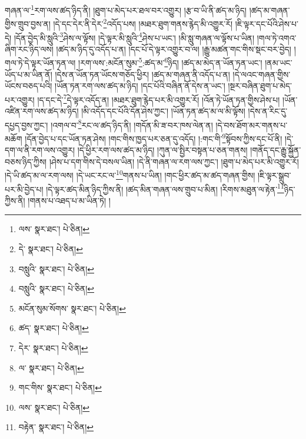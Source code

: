 གཞན་ལ་\footnote{ལས་  སྣར་ཐང་།  པེ་ཅིན། }རག་ལས་ཚད་ཉིད་ནི། །ཐུག་པ་མེད་པར་ཐལ་བར་འགྱུར། །རྩ་བ་ཡི་ནི་ཚད་མ་ཉིད། །ཚད་མ་གཞན་གྱིས་གྲུབ་བྱས་ན། །དེ་དང་དེར་ནི་དེར་\footnote{དེ་  སྣར་ཐང་།  པེ་ཅིན། }འདོད་པས། །མཐར་ཐུག་གནས་རྙེད་མི་འགྱུར་རོ། །ཇི་ལྟར་དང་པོའི་ཤེས་པ་དེ། །དོན་བྱེད་མི་སླུའི་\footnote{བསླུའི་  སྣར་ཐང་།  པེ་ཅིན། }ཤེས་ལ་ལྟོས། །དེ་ལྟར་མི་སླུའི་\footnote{བསླུའི་  སྣར་ཐང་།  པེ་ཅིན། }ཤེས་པ་ཡང་། །མི་སླུ་གཞན་ལ་ལྟོས་པ་ཡིན། །གལ་ཏེ་འགའ་ཞིག་རང་ཉིད་ལས། །ཚད་མ་ཉིད་དུ་འདོད་པ་ན། །དང་པོ་དེ་ལྟར་འགྱུར་བ་ལ། །རྒྱུ་མཚན་གང་གིས་སྡང་བར་བྱེད། །གལ་ཏེ་དེ་ལྟར་ཡོན་ཏན་ལ། །རག་ལས་:མངོན་སུམ་\footnote{མངོན་སུམ་སོགས་  སྣར་ཐང་།  པེ་ཅིན། }:ཚད་མ་\footnote{ཚད་  སྣར་ཐང་།  པེ་ཅིན། }ཉིད། །ཚད་མ་མེད་ན་ཡོན་ཏན་ཡང་། །ནམ་ཡང་ཡོད་པ་མ་ཡིན་ནོ། །དེས་ན་ཡོན་ཏན་ཡོངས་གཅོད་ཕྱིར། །ཚད་མ་གཞན་ནི་འདོད་པ་ན། །དེ་ལའང་གཞན་གྱིས་ཡོངས་བཅད་པའི། །ཡོན་ཏན་རག་ལས་ཚད་མ་ཉིད། །དང་པོའི་བཞིན་ནོ་དེས་ན་ཡང་། །སྔར་བཞིན་ཐུག་པ་མེད་པར་འགྱུར། །ད་དང་དེ་\footnote{དེར་  སྣར་ཐང་།  པེ་ཅིན། }དེ་ལྟར་འདོད་ན། །མཐར་ཐུག་རྙེད་པར་མི་འགྱུར་རོ། །འོན་ཏེ་ཡོན་ཏན་གྱིས་ཤེས་པ། །ཡོན་འཛིན་རག་ལས་ཚད་མ་ཉིད། །མི་འདོད་དང་པོའི་དོན་ཤེས་ཀྱང་། །ཡོན་ཏན་ཚད་མ་ལ་མི་ལྟོས། །དེས་ན་རིང་དུ་དཔྱད་བྱས་ཀྱང་། །འགལ་བ་\footnote{ལ་  སྣར་ཐང་།  པེ་ཅིན། }རང་ལ་ཚད་ཉིད་ནི། །གདོན་མི་ཟ་བར་ཁས་ལེན་ན། །དེ་བས་ཐོག་མར་གནས་པ་མཆོག །དོན་བྱེད་པ་དང་ཡོན་ཏན་ཤེས། །གང་གིས་ཁྱད་པར་ཅན་དུ་འདོད། །:གང་གི་\footnote{གང་གིས་  སྣར་ཐང་།  པེ་ཅིན། }སྟོབས་ཀྱིས་དང་པོ་ནི། །དེ་དག་ལ་ནི་རག་ལས་འགྱུར། །དེ་ཕྱིར་རག་ལས་ཚད་མ་ཉིད། །ཀུན་ལ་སྤྱིར་བསྟན་པ་ཅན་གནས། །གནོད་དང་རྒྱུ་སྐྱོན་བཅས་ཉིད་ཀྱིས། །ཤེས་པ་དག་གིས་དེ་བསལ་ཡིན། །དེ་ནི་གཞན་ལ་རག་ལས་ཀྱང་། །ཐུག་པ་མེད་པར་མི་འགྱུར་རོ། །དེ་ཡི་ཚད་མ་ལ་རག་ལས། །དེ་ཡང་རང་ལ་\footnote{ལས་  སྣར་ཐང་།  པེ་ཅིན། }གནས་པ་ཡིན། །གང་ཕྱིར་ཚད་མ་ཚད་གཞན་གྱིས། །ཇི་ལྟར་སྒྲུབ་པར་མི་བྱེད་པ། །དེ་ལྟར་ཚད་མིན་ཉིད་ཀྱིས་ནི། །ཚད་མིན་གཞན་ལས་གྲུབ་པ་མིན། །རིགས་མཐུན་ལ་རྟེན་\footnote{བརྟེན་  སྣར་ཐང་།  པེ་ཅིན། }ཉིད་ཀྱིས་ནི། །གནས་པ་འཐད་པ་མ་ཡིན་ཏེ། །
